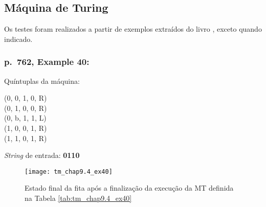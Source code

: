\subsection{Máquina de Turing}

Os testes foram realizados a partir de exemplos extraídos do livro
\cite[cap.\ 9.4]{judith}, exceto quando indicado.

\subsubsection*{p.\ 762, Example 40:}

\begin{table}[H]
    \begin{minipage}{0.666\linewidth}

        \begin{minipage}{.5\linewidth}
            Quíntuplas da máquina:
        \end{minipage}%
        \begin{minipage}{.5\linewidth}
            \begin{flushleft}
                \ttfamily
                (0, 0, 1, 0, R) \\
                (0, 1, 0, 0, R) \\
                (0, b, 1, 1, L) \\
                (1, 0, 0, 1, R) \\
                (1, 1, 0, 1, R)
            \end{flushleft}
        \end{minipage}

    \end{minipage}%
    \begin{minipage}{0.333\linewidth}

        \textit{String} de entrada: \textbf{0110}

    \end{minipage}

    \caption{\cite[p.\ 762, Example 40]{judith}}
    \label{tab:tm_chap9.4_ex40}
\end{table}

\begin{figure}[H]
    \centering
    \texttt{[image: tm\_chap9.4\_ex40]}
    \caption{
        Estado final da fita após a finalização da execução da MT definida na
        Tabela \ref{tab:tm_chap9.4_ex40}
    }
    \label{fig:tm_chap9.4_ex40}
\end{figure}

